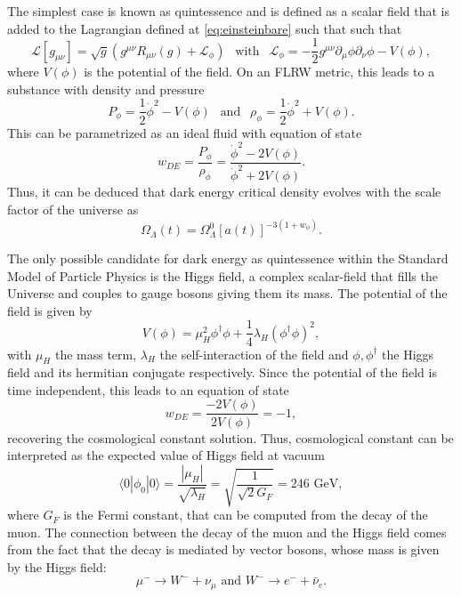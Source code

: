 The simplest case is known as quintessence and is defined as a scalar field that is added to the Lagrangian defined at \autoref{eq:einsteinbare} such that such that
\begin{equation}
\mathcal{L}[g_{\mu\nu}] = \sqrt{g}\left(g^{\mu\nu}R_{\mu\nu}(g)+\mathcal{L}_\phi\right)\ \ \mbox{ with }\ \ \mathcal{L}_\phi = -\frac{1}{2}g^{\mu\nu}\partial_\mu\phi\partial_\nu\phi-V(\phi),
\end{equation}
where $V(\phi)$ is the potential of the field. On an FLRW metric, this leads to a substance with density and pressure 
\begin{equation}
P_\phi = \frac{1}{2}\dot\phi^2-V(\phi)\ \ \mbox{ and }\ \ \rho_\phi=\frac{1}{2}\dot\phi^2+V(\phi).
\end{equation}
This can be parametrized as an ideal fluid with equation of state
\begin{equation}
w_{DE} = \frac{P_\phi}{\rho_\phi} = \frac{\dot\phi^2-2V(\phi)}{\dot\phi^2+2V(\phi)}.
\end{equation}
Thus, it can be deduced that dark energy critical density evolves with the scale factor of the universe as
\begin{equation}
\Omega_\Lambda(t) = \Omega_\Lambda^0 [a(t)]^{-3(1+w_\phi)}.
\end{equation}
\newline

The only possible candidate for dark energy as quintessence within the Standard Model of Particle Physics is the Higgs field, a complex scalar-field that fills the Universe and couples to gauge bosons giving them its mass. The potential of the field is given by
\begin{equation}
V(\phi) = \mu_H^2\phi^\dagger\phi+\frac{1}{4}\lambda_H(\phi^\dagger\phi)^2,
\end{equation}
with $\mu_H$ the mass term, $\lambda_H$ the self-interaction of the field and $\phi,\phi^\dagger$ the Higgs field and its hermitian conjugate respectively. Since the potential of the field is time independent, this leads to an equation of state
\begin{equation}
w_{DE} = \frac{-2V(\phi)}{2V(\phi)} = -1,
\end{equation}
recovering the cosmological constant solution. Thus, cosmological constant can be interpreted as the expected value of Higgs field at vacuum
\begin{equation}
\langle 0|\phi_0|0\rangle = \frac{|\mu_H|}{\sqrt{\lambda_H}}= \sqrt{\frac{1}{\sqrt{2}G_F}}= 246\mbox{ GeV},
\end{equation}
where $G_F$ is the Fermi constant, that can be computed from the decay of the muon. The connection between the decay of the muon and the Higgs field comes from the fact that the decay is mediated by vector bosons, whose mass is given by the Higgs field:
\begin{equation}
\mu^- \rightarrow W^- + \nu_\mu \mbox{ and }W^-\rightarrow e^-+\bar\nu_e.
\end{equation}
\newline

